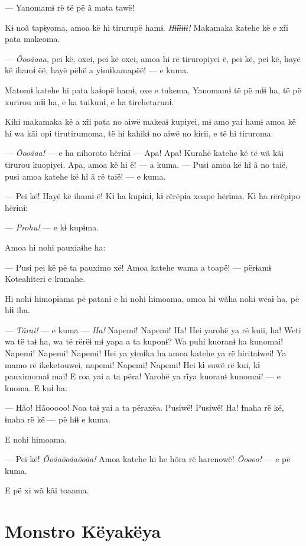 --- Yanomamɨ rë të pë ã mata tawë! 

Kɨ noã tapɨyoma, amoa kë hi tirurupë hamɨ. \textit{Hɨ̃ɨɨɨɨɨ! }Makamaka katehe kë e
xĩi pata makeoma. 

--- \textit{Õooãaaa}, pei kë, oxei, pei kë oxei, amoa hi rë tiruropiyei ë, pei
 kë, pei kë, hayë kë ihamɨ ëë, hayë pëhë a yɨmɨkamapëë! --- e kuma.

Matomɨ katehe hi pata kaɨopë hamɨ, oxe e tukema, Yanomamɨ të pë mɨɨ ha,
 të pë xurirou mɨɨ ha, e ha tuikunɨ, e ha tirehetarunɨ. 

Kihi makamaka kë a xĩi pata no aiwë makeaɨ kupiyei, mɨ amo yai hamɨ amoa
kë hi wa kãi opi tirutirumoma, të hi kahikɨ no aiwë no kirii, e të hi
tiruroma. 

--- \textit{Õooãaa!} --- e ha nihoroto hërɨnɨ --- Apa! Apa! Kurahë katehe kë të
 wã kãi tirurou kuopiyei. Apa, amoa kë hi ë! --- a kuma. --- Pusi amoa kë
 hĩ ã no taië, pusi amoa katehe kë hĩ ã rë taië! --- e kuma.

--- Pei kë! Hayë kë ihamɨ ë! Kɨ ha kupɨnɨ, kɨ rërëpɨa xoape hërɨma. Kɨ
ha rërëpɨpo hërɨnɨ: 

--- \textit{Prohu!} --- e kɨ kupɨma. 

Amoa hi nohi pauxiaɨhe ha: 

--- Pusi pei kë pë ta pauximo xë! Amoa katehe wama a toapë! --- përɨamɨ
Koteahiteri e kumahe. 

Hi nohi himopɨama pë patanɨ e hi nohi himoama, amoa hi wãha nohi wëaɨ
ha, pë hɨɨ iha. 

--- \textit{Tãrai!} --- e kuma --- \textit{Ha!} Napemi! Napemi! Ha! Hei yarohë ya rë kuii,
ha! Weti wa të taɨ ha, wa të rërëɨ mɨ yapa a ta kuponɨ? Wa puhi kuoranɨ
ha kunomai! Napemi! Napemi! Napemi! Hei ya yɨmɨka ha amoa katehe ya rë
hiritaɨwei! Ya mamo rë ikeketouwei, napemi! Napemi! Napemi! Hei kɨ suwë
rë kui, kɨ pauximomaɨ mai! E roa yai a ta përa! Yarohë ya rĩya kuoranɨ
kunomai! --- e kuoma. E kuɨ ha: 

--- Hão! Hãooooo! Noa taɨ yai a ta përaxëa. Pusiwë! Pusiwë! Ha! Ɨnaha rë
kë, ɨnaha rë kë --- pë hɨɨ e kuma. 

E nohi himoama. 

--- Pei kë! \textit{Õoãaõoãaõoãa!} Amoa katehe hi he hõra rë harenowë! \textit{Õoooo!} ---
e pë kuma. 

E pë xi wã kãi toaama.

\chapter{Monstro Këyakëya}


